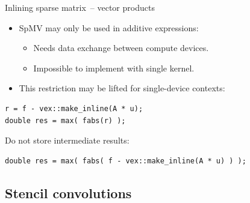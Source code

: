 \documentclass[@BEAMER_OPTIONS@]{beamer}
\begin{document}
\begin{frame}[fragile]{Inlining sparse matrix~-- vector products}
    \begin{itemize}
        \item SpMV may only be used in additive expressions:
            \begin{itemize}
                \item Needs data exchange between compute devices.
                \item Impossible to implement with single kernel.
            \end{itemize}
        \item This restriction may be lifted for single-device contexts:
    \end{itemize}
    \begin{exampleblock}{}
        \begin{lstlisting}[numbers=none]
r = f - vex::make_inline(A * u);
double res = max( fabs(r) );
        \end{lstlisting}
    \end{exampleblock}
    \pause
    \begin{exampleblock}{Do not store intermediate results:}
        \begin{lstlisting}[numbers=none]
double res = max( fabs( f - vex::make_inline(A * u) ) );
        \end{lstlisting}
    \end{exampleblock}
\end{frame}

\subsection{Stencil convolutions}
\end{document}
